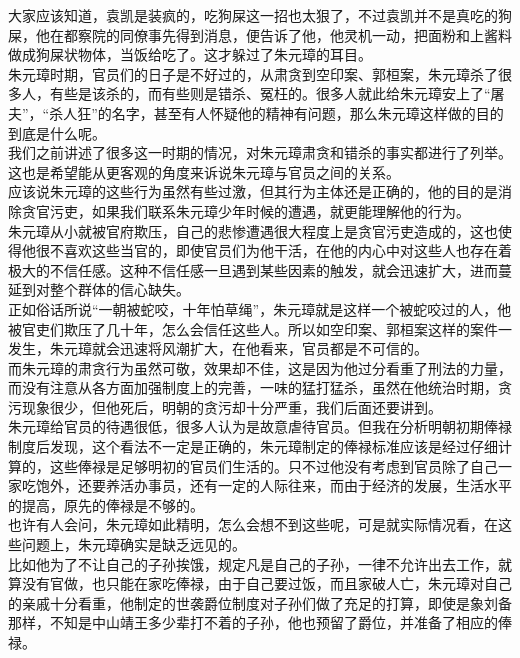 \begin{multicols}{\theparacolNo}
大家应该知道，袁凯是装疯的，吃狗屎这一招也太狠了，不过袁凯并不是真吃的狗屎，他在都察院的同僚事先得到消息，便告诉了他，他灵机一动，把面粉和上酱料做成狗屎状物体，当饭给吃了。这才躲过了朱元璋的耳目。\\

朱元璋时期，官员们的日子是不好过的，从肃贪到空印案、郭桓案，朱元璋杀了很多人，有些是该杀的，而有些则是错杀、冤枉的。很多人就此给朱元璋安上了“屠夫”，“杀人狂”的名字，甚至有人怀疑他的精神有问题，那么朱元璋这样做的目的到底是什么呢。\\

我们之前讲述了很多这一时期的情况，对朱元璋肃贪和错杀的事实都进行了列举。这也是希望能从更客观的角度来诉说朱元璋与官员之间的关系。\\

应该说朱元璋的这些行为虽然有些过激，但其行为主体还是正确的，他的目的是消除贪官污吏，如果我们联系朱元璋少年时候的遭遇，就更能理解他的行为。\\

朱元璋从小就被官府欺压，自己的悲惨遭遇很大程度上是贪官污吏造成的，这也使得他很不喜欢这些当官的，即使官员们为他干活，在他的内心中对这些人也存在着极大的不信任感。这种不信任感一旦遇到某些因素的触发，就会迅速扩大，进而蔓延到对整个群体的信心缺失。\\

正如俗话所说“一朝被蛇咬，十年怕草绳”，朱元璋就是这样一个被蛇咬过的人，他被官吏们欺压了几十年，怎么会信任这些人。所以如空印案、郭桓案这样的案件一发生，朱元璋就会迅速将风潮扩大，在他看来，官员都是不可信的。\\

而朱元璋的肃贪行为虽然可敬，效果却不佳，这是因为他过分看重了刑法的力量，而没有注意从各方面加强制度上的完善，一味的猛打猛杀，虽然在他统治时期，贪污现象很少，但他死后，明朝的贪污却十分严重，我们后面还要讲到。\\

朱元璋给官员的待遇很低，很多人认为是故意虐待官员。但我在分析明朝初期俸禄制度后发现，这个看法不一定是正确的，朱元璋制定的俸禄标准应该是经过仔细计算的，这些俸禄是足够明初的官员们生活的。只不过他没有考虑到官员除了自己一家吃饱外，还要养活办事员，还有一定的人际往来，而由于经济的发展，生活水平的提高，原先的俸禄是不够的。\\

也许有人会问，朱元璋如此精明，怎么会想不到这些呢，可是就实际情况看，在这些问题上，朱元璋确实是缺乏远见的。\\

比如他为了不让自己的子孙挨饿，规定凡是自己的子孙，一律不允许出去工作，就算没有官做，也只能在家吃俸禄，由于自己要过饭，而且家破人亡，朱元璋对自己的亲戚十分看重，他制定的世袭爵位制度对子孙们做了充足的打算，即使是象刘备那样，不知是中山靖王多少辈打不着的子孙，他也预留了爵位，并准备了相应的俸禄。\\


\end{multicols}
